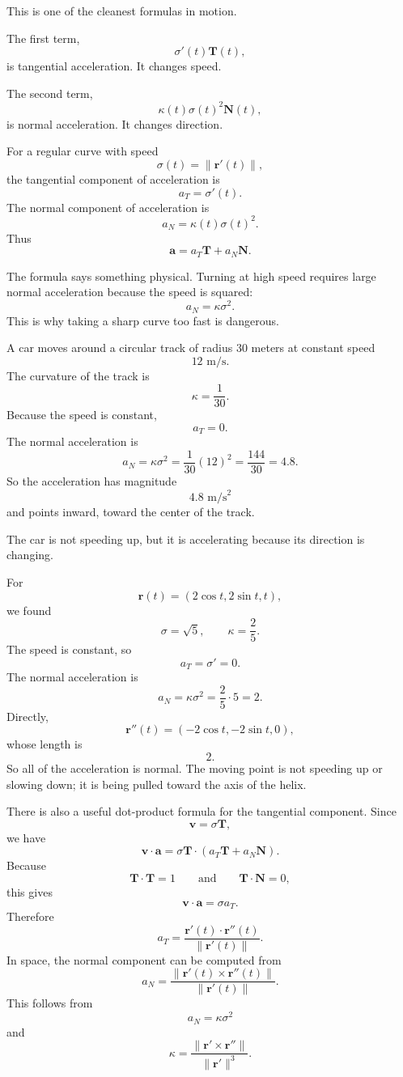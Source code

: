 This is one of the cleanest formulas in motion.

The first term,
\[
    \sigma'(t)\mathbf T(t),
\]
is tangential acceleration.  It changes speed.

The second term,
\[
    \kappa(t)\sigma(t)^2\mathbf N(t),
\]
is normal acceleration.  It changes direction.

\begin{definition}
For a regular curve with speed
\[
    \sigma(t)=\|\mathbf r'(t)\|,
\]
the tangential component of acceleration is
\[
\boxed{
    a_T=\sigma'(t).
}
\]
The normal component of acceleration is
\[
\boxed{
    a_N=\kappa(t)\sigma(t)^2.
}
\]
Thus
\[
\boxed{
    \mathbf a=a_T\mathbf T+a_N\mathbf N.
}
\]
\end{definition}

The formula says something physical.  Turning at high speed requires large normal
acceleration because the speed is squared:
\[
    a_N=\kappa\sigma^2.
\]
This is why taking a sharp curve too fast is dangerous.

\begin{example}
A car moves around a circular track of radius \(30\) meters at constant speed
\[
    12\text{ m/s}.
\]
The curvature of the track is
\[
    \kappa=\frac{1}{30}.
\]
Because the speed is constant,
\[
    a_T=0.
\]
The normal acceleration is
\[
    a_N=\kappa\sigma^2
    =
    \frac{1}{30}(12)^2
    =
    \frac{144}{30}
    =
    4.8.
\]
So the acceleration has magnitude
\[
    4.8\text{ m/s}^2
\]
and points inward, toward the center of the track.

The car is not speeding up, but it is accelerating because its direction is changing.
\end{example}

\begin{example}
For
\[
    \mathbf r(t)=(2\cos t,2\sin t,t),
\]
we found
\[
    \sigma=\sqrt5,
    \qquad
    \kappa=\frac25.
\]
The speed is constant, so
\[
    a_T=\sigma'=0.
\]
The normal acceleration is
\[
    a_N=\kappa\sigma^2
    =
    \frac25\cdot5
    =
    2.
\]
Directly,
\[
    \mathbf r''(t)=(-2\cos t,-2\sin t,0),
\]
whose length is
\[
    2.
\]
So all of the acceleration is normal.  The moving point is not speeding up or slowing
down; it is being pulled toward the axis of the helix.
\end{example}

There is also a useful dot-product formula for the tangential component.  Since
\[
    \mathbf v=\sigma\mathbf T,
\]
we have
\[
    \mathbf v\cdot\mathbf a
    =
    \sigma\mathbf T\cdot(a_T\mathbf T+a_N\mathbf N).
\]
Because
\[
    \mathbf T\cdot\mathbf T=1
    \qquad\text{and}\qquad
    \mathbf T\cdot\mathbf N=0,
\]
this gives
\[
    \mathbf v\cdot\mathbf a=\sigma a_T.
\]
Therefore
\[
\boxed{
    a_T=\frac{\mathbf r'(t)\cdot\mathbf r''(t)}{\|\mathbf r'(t)\|}.
}
\]
In space, the normal component can be computed from
\[
\boxed{
    a_N=
    \frac{\|\mathbf r'(t)\times\mathbf r''(t)\|}{\|\mathbf r'(t)\|}.
}
\]
This follows from
\[
    a_N=\kappa\sigma^2
\]
and
\[
    \kappa=
    \frac{\|\mathbf r'\times\mathbf r''\|}{\|\mathbf r'\|^3}.
\]

